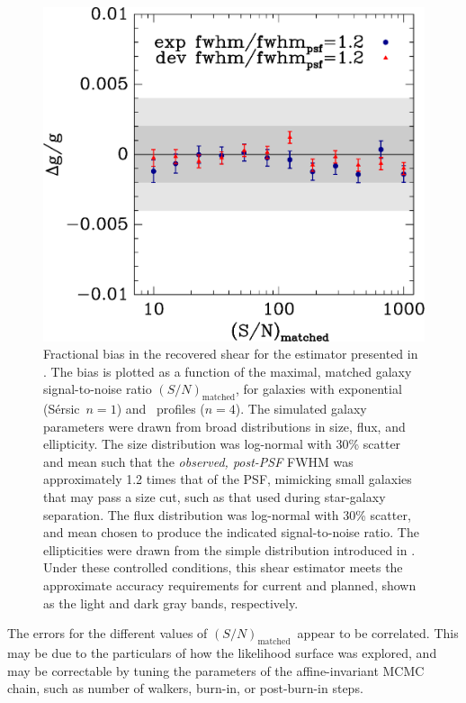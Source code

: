 \documentclass[usegraphicx,usenatbib]{mn2e}
\newcommand{\Msn}{$(S/N)_{\textrm{matched}}$}
\newcommand{\sersic}{S\'{e}rsic}
\newcommand{\lognormscatt}{30}
\begin{document}
\begin{figure}
 \includegraphics[scale=0.45]{figures/ngmix-fwhm1.2.eps}
 \caption{ Fractional bias in the recovered shear for the estimator presented
     in \citet{ba14}.  The bias is plotted as a function of the maximal, matched
     galaxy signal-to-noise ratio \Msn, for galaxies with exponential (\sersic\
     $n=1$) and \devauc\ profiles ($n=4$).  The simulated galaxy parameters
     were drawn from broad distributions in size, flux, and ellipticity.  The
     size distribution was log-normal with \lognormscatt\% scatter and mean
     such that the {\it observed, post-PSF} FWHM was approximately 1.2 times
     that of the PSF, mimicking small galaxies that may pass a size
     cut, such as that used during star-galaxy separation.  The flux
     distribution was log-normal with \lognormscatt\% scatter, and mean chosen
     to produce the indicated signal-to-noise ratio.  The ellipticities were
     drawn from the simple distribution introduced in \citet{ba14}. Under these
     controlled conditions, this shear estimator meets the approximate accuracy
 requirements for current and planned, shown as the light and dark gray bands,
 respectively.}
 \label{fig:fracerr}
\end{figure}

The errors for the different values of \Msn\ appear to be correlated.  This may
be due to the particulars of how the likelihood surface was explored, and may be
correctable by tuning the parameters of the affine-invariant MCMC chain, such
as number of walkers, burn-in, or post-burn-in steps.
\end{document}
